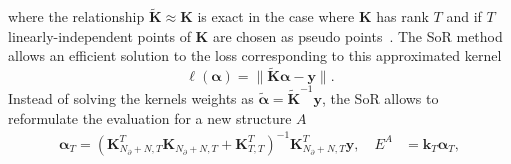 where the relationship $\tilde{\mathbf{K}} \approx \mathbf{K}$ is exact in the case where $\mathbf{K}$ has rank $T$ and if $T$ linearly-independent points of $\mathbf{K}$ are chosen as pseudo points~\cite{williams2000using}.
The SoR method allows an efficient solution to the loss corresponding to this approximated kernel
\begin{equation}
\ell(\boldsymbol{\alpha}) = \| \tilde{\mathbf{K}}\boldsymbol{\alpha} - \mathbf{y} \|.
\end{equation}
Instead of solving the kernels weights as $\tilde{\boldsymbol{\alpha}} = \tilde{\mathbf{K}}^{-1}\mathbf{y}$, the SoR allows to reformulate the evaluation for a new structure $A$
\begin{subequations}
\begin{align}
  \boldsymbol{\alpha}_T = (\mathbf{K}_{N_{\partial}+N,T}^T\mathbf{K}_{N_{\partial}+N,T}^{\phantom{1}} + \mathbf{K}_{T,T}^T)^{-1}\mathbf{K}_{N_{\partial}+N,T}^T\mathbf{y},\quad E^A &= \mathbf{k}_{T}\boldsymbol{\alpha}_T, 
%  
\end{align}
\end{subequations}
